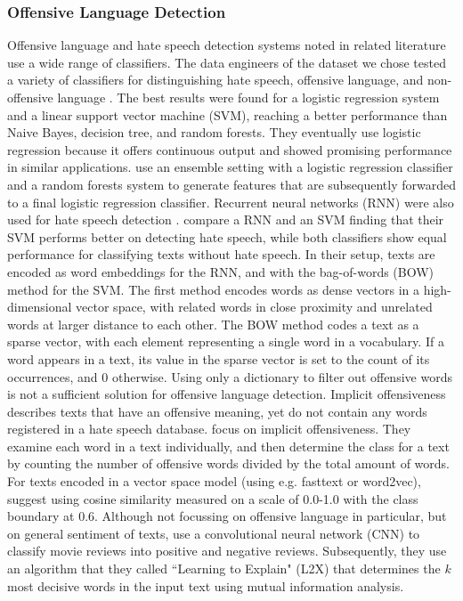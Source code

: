 \subsubsection{Offensive Language Detection}
\label{subsubsec:method_classifier}
Offensive language and hate speech detection systems noted in related literature use a wide range of classifiers.\newline
The data engineers of the dataset we chose tested a variety of classifiers for distinguishing hate speech, offensive language, and non-offensive language \cite{davidson2017automated}. The best results were found for a logistic regression system and a linear support vector machine (SVM), reaching a better performance than Naive Bayes, decision tree, and random forests. They eventually use logistic regression because it offers continuous output and showed promising performance in similar applications. \cite{montani2018tuwienkbs} use an ensemble setting with a logistic regression classifier and a random forests system to generate features that are subsequently forwarded to a final logistic regression classifier. Recurrent neural networks (RNN) were also used for hate speech detection \cite{del2017hate, rother2018ulmfit}. \cite{del2017hate} compare a RNN and an SVM finding that their SVM performs better on detecting hate speech, while both classifiers show equal performance for classifying texts without hate speech. In their setup, texts are encoded as word embeddings for the RNN, and with the bag-of-words (BOW) method for the SVM. The first method encodes words as dense vectors in a high-dimensional vector space, with related words in close proximity and unrelated words at larger distance to each other. The BOW method codes a text as a sparse vector, with each element representing a single word in a vocabulary. If a word appears in a text, its value in the sparse vector is set to the count of its occurrences, and 0 otherwise. Using only a dictionary to filter out offensive words is not a sufficient solution for offensive language detection. Implicit offensiveness describes texts that have an offensive meaning, yet do not contain any words registered in a hate speech database. \cite{klenner2018offensive} focus on implicit offensiveness. They examine each word in a text individually, and then determine the class for a text by counting the number of offensive words divided by the total amount of words. For texts encoded in a vector space model (using e.g. fasttext or word2vec), \cite{gupta2018proposed} suggest using cosine similarity measured on a scale of 0.0-1.0 with the class boundary at 0.6. Although not focussing on offensive language in particular, but on general sentiment of texts, \cite{chen2018learning} use a convolutional neural network (CNN) to classify movie reviews into positive and negative reviews. Subsequently, they use an algorithm that they called ``Learning to Explain" (L2X) that determines the $k$ most decisive words in the input text using mutual information analysis.\medskip \newline
